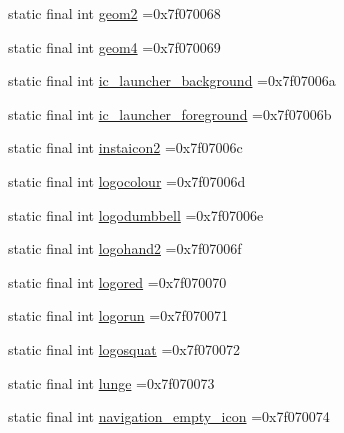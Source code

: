 \begin{DoxyCompactItemize}
\item 
static final int \mbox{\hyperlink{classcom_1_1example_1_1trainawearapplication_1_1_r_1_1drawable_ae3732955fe76d8dd4a7666ef3828fa45}{geom2}} =0x7f070068
\item 
static final int \mbox{\hyperlink{classcom_1_1example_1_1trainawearapplication_1_1_r_1_1drawable_a436bbccdd26b5d6b74a2f71a0185b65d}{geom4}} =0x7f070069
\item 
static final int \mbox{\hyperlink{classcom_1_1example_1_1trainawearapplication_1_1_r_1_1drawable_a88238d5cb59bda1f1da5dfcddc44455a}{ic\+\_\+launcher\+\_\+background}} =0x7f07006a
\item 
static final int \mbox{\hyperlink{classcom_1_1example_1_1trainawearapplication_1_1_r_1_1drawable_afd7417b7c3d91fa76fcde0332fbe3c1a}{ic\+\_\+launcher\+\_\+foreground}} =0x7f07006b
\item 
static final int \mbox{\hyperlink{classcom_1_1example_1_1trainawearapplication_1_1_r_1_1drawable_aca9c57f0fe521565d05ab2f7b235b9f8}{instaicon2}} =0x7f07006c
\item 
static final int \mbox{\hyperlink{classcom_1_1example_1_1trainawearapplication_1_1_r_1_1drawable_ab23ec54f94e51f8d391612839a8893a1}{logocolour}} =0x7f07006d
\item 
static final int \mbox{\hyperlink{classcom_1_1example_1_1trainawearapplication_1_1_r_1_1drawable_a2aba688ffaf1d82dc9a140758dc8281a}{logodumbbell}} =0x7f07006e
\item 
static final int \mbox{\hyperlink{classcom_1_1example_1_1trainawearapplication_1_1_r_1_1drawable_ad40d914bf6d14e5646cc1a734543d53e}{logohand2}} =0x7f07006f
\item 
static final int \mbox{\hyperlink{classcom_1_1example_1_1trainawearapplication_1_1_r_1_1drawable_afb89c247fcf1e065406ef61e1c32d197}{logored}} =0x7f070070
\item 
static final int \mbox{\hyperlink{classcom_1_1example_1_1trainawearapplication_1_1_r_1_1drawable_a71320c275f1af6b3e273b454038cd784}{logorun}} =0x7f070071
\item 
static final int \mbox{\hyperlink{classcom_1_1example_1_1trainawearapplication_1_1_r_1_1drawable_ad4a9c2314179b2ee467a8d7b5e9cb6c0}{logosquat}} =0x7f070072
\item 
static final int \mbox{\hyperlink{classcom_1_1example_1_1trainawearapplication_1_1_r_1_1drawable_affff11d2223bdd47934710696305d0e0}{lunge}} =0x7f070073
\item 
static final int \mbox{\hyperlink{classcom_1_1example_1_1trainawearapplication_1_1_r_1_1drawable_a53762ad1a857391e1a16a5b0e43f1945}{navigation\+\_\+empty\+\_\+icon}} =0x7f070074

\end{DoxyCompactItemize}
